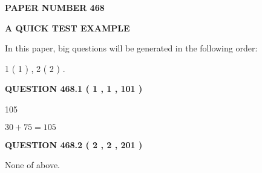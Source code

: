 \documentclass[12pt]{article}
\begin{document}
   
   
   
\newpage 
\setcounter{page}{ 
   468001 } 
   
   
   
   
 {\textbf{ \Large{ PAPER NUMBER  468  }}}
   
   
\vspace{0.2in}
   
   
   
   
   
   
 \vspace{0.2in}
{\LARGE {\textbf{ A QUICK TEST EXAMPLE}}}
   
   
   
\vspace{0.2in}
   
In this paper, big questions will be generated in the following order: 
   
   
   1 ( 1 )
 ,
   2 ( 2 )
 .
  
\vspace{0.2in}
  
{\textbf{\Large{QUESTION
468.1 
 ( 1 , 1 , 101 )
}}}
  
  
 
 
\noindent{}

105
 
 
 
 
\noindent{}

$ %
30 +  %
75=   %
105$
 
 
  
\vspace{0.2in}
  
{\textbf{\Large{QUESTION
468.2 
 ( 2 , 2 , 201 )
}}}
  
  
 
 
\noindent{}
 
 
 None of above.
 
 
 
 
   
   
 \vspace{0.2in}
 
   
   
   
   
\end{document}
